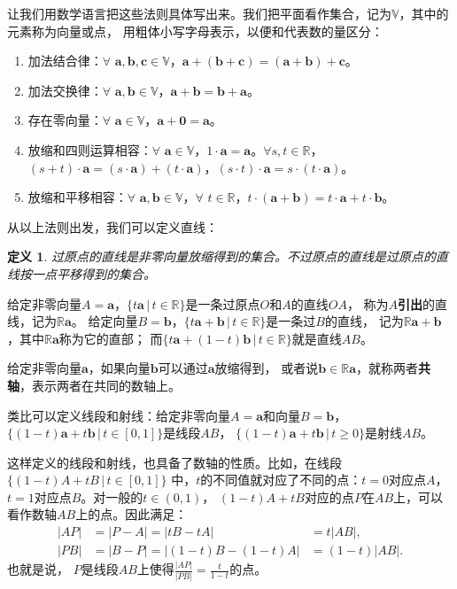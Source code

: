 \documentclass[12pt,UTF8]{ctexbook}
\newtheorem{df}{定义}[section]
\begin{document}
让我们用数学语言把这些法则具体写出来。我们把平面看作集合，记为$\mathbb{V}$，其中的元素称为向量或点，
用粗体小写字母表示，以便和代表数的量区分：
\begin{enumerate}
    \item 加法结合律：$\forall \,\, \mathbf{a}, \mathbf{b}, \mathbf{c} \in \mathbb{V}$，$\mathbf{a}+ (\mathbf{b} + \mathbf{c}) = (\mathbf{a} + \mathbf{b}) + \mathbf{c}$。
    \item 加法交换律：$\forall \,\, \mathbf{a}, \mathbf{b} \in \mathbb{V}$，$\mathbf{a} + \mathbf{b} = \mathbf{b} + \mathbf{a}$。
    \item 存在零向量：$\forall \,\, \mathbf{a} \in \mathbb{V}$，$\mathbf{a} + \mathbf{0} = \mathbf{a}$。
    \item 放缩和四则运算相容：$\forall \,\, \mathbf{a} \in \mathbb{V}$，$1\cdot \mathbf{a} = \mathbf{a}$。$\forall s, t \in \mathbb{R}$，$(s + t)\cdot\mathbf{a} = (s\cdot\mathbf{a}) + (t\cdot\mathbf{a})$，$(s \cdot t)\cdot \mathbf{a} = s \cdot (t\cdot \mathbf{a})$。
    \item 放缩和平移相容：$\forall \,\, \mathbf{a}, \mathbf{b} \in \mathbb{V}$，$\forall \,\, t \in \mathbb{R}$，$t\cdot(\mathbf{a} + \mathbf{b}) = t\cdot\mathbf{a} + t\cdot\mathbf{b}$。
\end{enumerate}

从以上法则出发，我们可以定义直线：
\begin{df}
    过原点的直线是非零向量放缩得到的集合。不过原点的直线是过原点的直线按一点平移得到的集合。
\end{df}
给定非零向量$A = \mathbf{a}$，$ \{t\mathbf{a} \, | \, t\in\mathbb{R}\}$是一条过原点$O$和$A$的直线$OA$，
称为$A$\textbf{引出}的直线，记为$\mathbb{R}\mathbf{a}$。
给定向量$B = \mathbf{b}$，$ \{t\mathbf{a}+\mathbf{b} \, | \, t\in\mathbb{R}\}$是一条过$B$的直线，
记为$\mathbb{R}\mathbf{a}+\mathbf{b}$，其中$\mathbb{R}\mathbf{a}$称为它的直部；
而$ \{t\mathbf{a}+(1 - t)\mathbf{b} \, | \, t\in\mathbb{R}\}$就是直线$AB$。

给定非零向量$\mathbf{a}$，如果向量$\mathbf{b}$可以通过$\mathbf{a}$放缩得到，
或者说$\mathbf{b}\in \mathbb{R}\mathbf{a}$，就称两者\textbf{共轴}，表示两者在共同的数轴上。

类比可以定义线段和射线：给定非零向量$A = \mathbf{a}$和向量$B =\mathbf{b}$，
$ \{(1 - t)\mathbf{a}+t\mathbf{b} \, | \, t\in [0, 1]\}$是线段$AB$，
$ \{(1 - t)\mathbf{a}+t\mathbf{b} \, | \, t \geqslant 0 \}$是射线$AB$。

这样定义的线段和射线，也具备了数轴的性质。比如，在线段$\{(1 - t)A+tB \, | \, t\in [0, 1]\}$
中，$t$的不同值就对应了不同的点：$t = 0$对应点$A$，$t=1$对应点$B$。对一般的$t\in (0, 1)$，
$(1 - t)A+tB$对应的点$P$在$AB$上，可以看作数轴$AB$上的点。因此满足：
$$
\begin{array}{lll}
    |AP| &= |P - A| = |tB - tA| &= t|AB|, \\
    |PB| &= |B - P| = |(1 - t)B - (1 - t)A| &= (1 - t)|AB|.
\end{array}
$$
也就是说，
$P$是线段$AB$上使得$ \frac{|AP|}{|PB|} = \frac{t}{1 - t}$的点。
\end{document}
